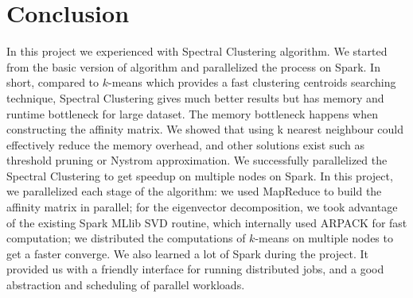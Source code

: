 \documentclass{acm_proc_article-sp}
\begin{document}
\section{Conclusion}
In this project we experienced with Spectral Clustering algorithm. We started from the basic version of algorithm and parallelized the process on Spark. In short, compared to $k$-means which provides a fast clustering centroids searching technique, Spectral Clustering gives much better results but has memory and runtime bottleneck for large dataset. The memory bottleneck happens when constructing the affinity matrix. We showed that using k nearest neighbour could effectively reduce the memory overhead, and other solutions exist such as threshold pruning or Nystrom approximation. We successfully parallelized the Spectral Clustering to get speedup on multiple nodes on Spark. In this project, we parallelized each stage of the algorithm: we used MapReduce to build the affinity matrix in parallel; for the eigenvector decomposition, we took advantage of the existing Spark MLlib SVD routine, which internally used ARPACK for fast computation; we distributed the computations of $k$-means on multiple nodes to get a faster converge. We also learned a lot of Spark during the project. It provided us with a friendly interface for running distributed jobs, and a good abstraction and scheduling of parallel workloads.


%
%

\balancecolumns
\end{document}
